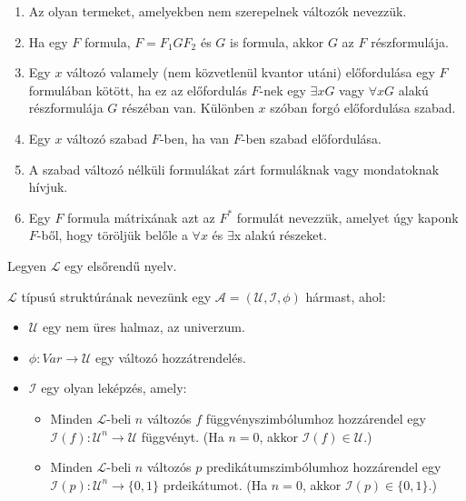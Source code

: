 \begin{frame}

\begin{tcolorbox}[title={Kötött, szabad változó, nyílt, zárt formula}]
\begin{enumerate}
\item Az olyan termeket, amelyekben nem szerepelnek változók  nevezzük.
\item Ha egy $F$ formula, $F = F_1GF_2$ és $G$ is formula, akkor $G$ az $F$ részformulája.
\item Egy $x$ változó valamely (nem közvetlenül kvantor utáni) előfordulása egy $F$ formulában kötött, ha ez az előfordulás $F$-nek egy ${\exists}xG$ vagy ${\forall}xG$ alakú részformulája $G$ részéban van. Különben $x$ szóban forgó előfordulása szabad.
\item Egy $x$ változó szabad $F$-ben, ha van $F$-ben szabad előfordulása.
\item A szabad változó nélküli formulákat zárt formuláknak vagy mondatoknak hívjuk.
\item Egy $F$ formula mátrixának azt az $F^*$ formulát nevezzük, amelyet úgy kaponk $F$-ből, hogy töröljük belőle a ${\forall}x$ és ${\exists}$x alakú részeket.
\end{enumerate}
\end{tcolorbox}

\begin{tcolorbox}[title={Az elsőrendű nyelv szemantikája}]
Legyen $\mathcal{L}$ egy elsőrendű nyelv.\\
\mmedskip

$\mathcal{L}$ típusú struktúrának nevezünk egy $\mathcal{A} = (\mathcal{U}, \mathcal{I}, {\phi})$ hármast, ahol:\\
\mmedskip

\begin{itemize}
\item $\mathcal{U}$ egy nem üres halmaz, az univerzum.
\item ${\phi} : Var \rightarrow \mathcal{U}$ egy változó hozzátrendelés.
\item $\mathcal{I}$ egy olyan leképzés, amely:
\begin{itemize}
\item Minden $\mathcal{L}$-beli $n$ változós $f$ függvényszimbólumhoz hozzárendel egy $\mathcal{I}(f) : \mathcal{U}^n \rightarrow \mathcal{U}$ függvényt. (Ha $n = 0$, akkor $\mathcal{I}(f) \in \mathcal{U}$.)
\item Minden $\mathcal{L}$-beli $n$ változós $p$ predikátumszimbólumhoz hozzárendel egy $\mathcal{I}(p) : \mathcal{U}^n \rightarrow \{0, 1\}$ prdeikátumot. (Ha $n = 0$, akkor $\mathcal{I}(p) \in \{0, 1\}$.)
\end{itemize}
\end{itemize}

\end{tcolorbox}

\end{frame}

